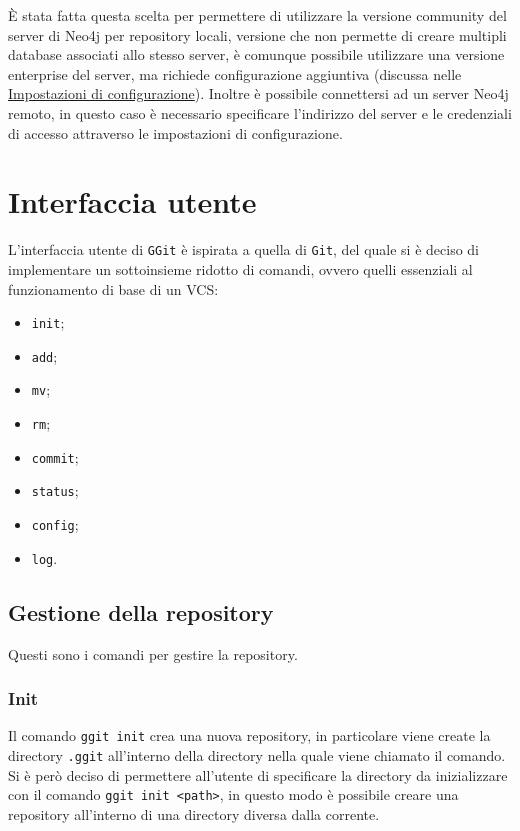 È stata fatta questa scelta per permettere di utilizzare la versione community del server di Neo4j per repository locali, versione che non permette di creare multipli database associati allo stesso server, è comunque possibile utilizzare una versione enterprise del server, ma richiede configurazione aggiuntiva (discussa nelle \hyperref[sec:impostazioni]{Impostazioni di configurazione}).
Inoltre è possibile connettersi ad un server Neo4j remoto, in questo caso è necessario specificare l'indirizzo del server e le credenziali di accesso attraverso le impostazioni di configurazione.

\section{Interfaccia utente}
\label{sec:interfaccia}
L'interfaccia utente di \texttt{GGit} è ispirata a quella di \texttt{Git}, del quale si è deciso di implementare un sottoinsieme ridotto di comandi, ovvero quelli essenziali al funzionamento di base di un VCS:
\begin{itemize}
    \item \texttt{init};
    \item \texttt{add};
    \item \texttt{mv};
    \item \texttt{rm};
    \item \texttt{commit};
    \item \texttt{status};
    \item \texttt{config};
    \item \texttt{log}.
\end{itemize}

\subsection{Gestione della repository}
Questi sono i comandi per gestire la repository.

\subsubsection{Init}
Il comando \texttt{ggit init} crea una nuova repository, in particolare viene create la directory \texttt{.ggit} all'interno della directory nella quale viene chiamato il comando.
Si è però deciso di permettere all'utente di specificare la directory da inizializzare con il comando \texttt{ggit init <path>}, in questo modo è possibile creare una repository all'interno di una directory diversa dalla corrente.

